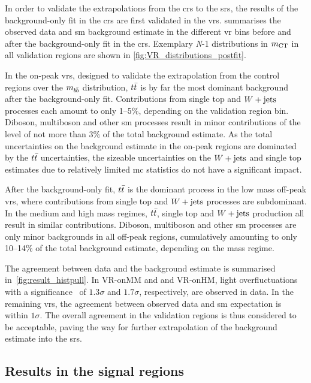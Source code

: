 

In order to validate the extrapolations from the \glspl{cr} to the \glspl{sr}, the results of the background-only fit in the \glspl{cr} are first validated in the \glspl{vr}.
 summarises the observed data and \gls{sm} background estimate in the different \gls{vr} bins before and after the background-only fit in the \glspl{cr}.
Exemplary \textit{N}-1 distributions in $m_{\textrm{CT}}$ in all validation regions are shown in \cref{fig:VR_distributions_postfit}.

In the on-peak \glspl{vr}, designed to validate the extrapolation from the control regions over the $m_{b\hspace{-0.06em}\bar{b}}$ distribution, $t\bar{t}$ is by far the most dominant background after the background-only fit.
Contributions from single top and $W+\mathrm{jets}$ processes each amount to only 1--5\%, depending on the validation region bin.
Diboson, multiboson and other \gls{sm} processes result in minor contributions of the level of not more than 3\% of the total background estimate.
As the total uncertainties on the background estimate in the on-peak regions are dominated by the $t\bar{t}$ uncertainties, the sizeable uncertainties on the $W+\mathrm{jets}$ and single top estimates due to relatively limited \gls{mc} statistics do not have a significant impact.

After the background-only fit, $t\bar{t}$ is the dominant process in the low mass off-peak \glspl{vr}, where contributions from single top and $W+\mathrm{jets}$ processes are subdominant.
In the medium and high mass regimes, $t\bar{t}$, single top and $W+\mathrm{jets}$ production all result in similar contributions.
Diboson, multiboson and other \gls{sm} processes are only minor backgrounds in all off-peak regions, cumulatively amounting to only 10--14\% of the total background estimate, depending on the mass regime.

The agreement between data and the background estimate is summarised in~\cref{fig:result_histpull}.
In \mbox{VR-onMM} and and \mbox{VR-onHM}, light overfluctuations with a significance~\cite{Cousins:2007bmb} of $1.3\sigma$ and $1.7\sigma$, respectively, are observed in data.
In the remaining \glspl{vr}, the agreement between observed data and \gls{sm} expectation is within $1\sigma$.
The overall agreement in the validation regions is thus considered to be acceptable, paving the way for further extrapolation of the background estimate into the \glspl{sr}.

\subsection{Results in the signal regions}

